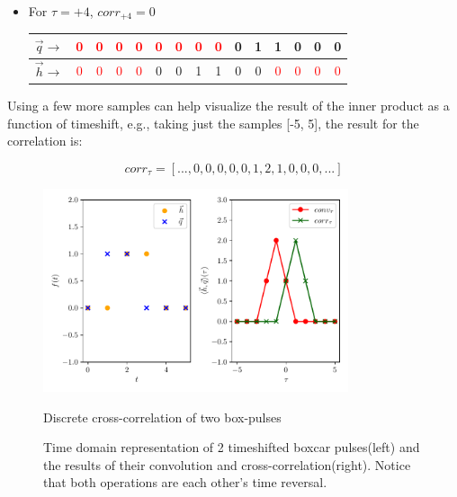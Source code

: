 \begin{itemize}
\begin{center}
\end{center}


\item For $\tau = +4$, $corr_{+4}=0$

\begin{center}

\begin{tabular}{c|c|c|c|c| c|c|c|c|c|c |c|c|c|c|}

$\vec{q} \rightarrow$&\textcolor{red}{0}&\textcolor{red}{0}&\textcolor{red}{0}&\textcolor{red}{0}&\textcolor{red}{0}&\textcolor{red}{0}&\textcolor{red}{0}&\textcolor{red}{0}&0&1&1&0&0&0\\

\hline
$\vec{h} \rightarrow$&\textcolor{red}{0}&\textcolor{red}{0}&\textcolor{red}{0}&\textcolor{red}{0}&0&0&1&1&0&0&\textcolor{red}{0}&\textcolor{red}{0}&\textcolor{red}{0}&\textcolor{red}{0}
\end{tabular}

\end{center}

\end{itemize}

\vspace{1cm}

Using a few more samples can help visualize the result of the inner product as a function of timeshift, e.g., taking just the samples [-5, 5], the result for the correlation is:

$$corr_\tau = [...,0,0,0,0,0,1,2,1,0,0,0 ,...]$$



\begin{figure}[hbt!]
\begin{center}
\includegraphics[width=0.8\textwidth, angle=0]{images/Data_analysis/sig_proc/corr.pdf}
\captionsetup{width=0.8\textwidth}
\caption{Discrete cross-correlation of two box-pulses}
\caption*{Time domain representation of 2 timeshifted boxcar pulses(left) and the results of their convolution and cross-correlation(right). Notice that both operations are each other's time reversal.}
\label{fig:3}
\end{center}
\end{figure}

